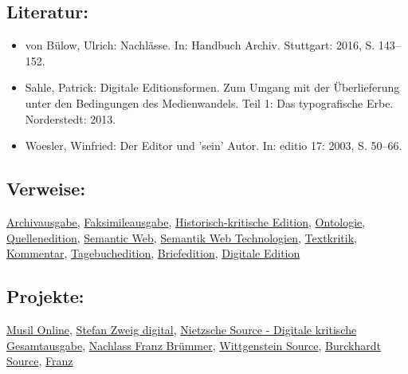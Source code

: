 \documentclass{article}
\begin{document}
        \subsection*{Literatur:}\begin{itemize}\item von Bülow, Ulrich: Nachlässe. In: Handbuch Archiv. Stuttgart: 2016, S. 143–152.\item Sahle, Patrick: Digitale Editionsformen. Zum Umgang mit der
                              Überlieferung unter den Bedingungen des Medienwandels. Teil 1: Das
                              typografische Erbe. Norderstedt: 2013.\item Woesler, Winfried: Der Editor und 'sein' Autor. In: editio 17: 2003, S. 50–66.\end{itemize}\subsection*{Verweise:}\href{https://gams.uni-graz.at/o:konde.33}{Archivausgabe}, \href{https://gams.uni-graz.at/o:konde.83}{Faksimileausgabe}, \href{https://gams.uni-graz.at/o:konde.93}{Historisch-kritische Edition}, \href{https://gams.uni-graz.at/o:konde.151}{Ontologie}, \href{https://gams.uni-graz.at/o:konde.160}{Quellenedition}, \href{https://gams.uni-graz.at/o:konde.167}{Semantic Web}, \href{https://gams.uni-graz.at/o:konde.168}{Semantik Web Technologien}, \href{https://gams.uni-graz.at/o:konde.192}{Textkritik}, \href{https://gams.uni-graz.at/o:konde.34}{Kommentar}, \href{https://gams.uni-graz.at/o:konde.175}{Tagebuchedition}, \href{https://gams.uni-graz.at/o:konde.39}{Briefedition}, \href{https://gams.uni-graz.at/o:konde.59}{Digitale Edition}\subsection*{Projekte:}\href{http://musilonline.at}{Musil Online}, \href{www.stefanzweig.digital}{Stefan Zweig
                           digital}, \href{http://www.nietzschesource.org/#eKGWB}{Nietzsche Source - Digitale kritische Gesamtausgabe}, \href{http://bruemmer.staatsbibliothek-berlin.de/nlbruemmer/}{Nachlass
                           Franz Brümmer}, \href{http://www.wittgensteinsource.org}{Wittgenstein
                           Source}, \href{http://burckhardtsource.org}{Burckhardt
                           Source}, \href{https://gams.uni-graz.at/context:bag}{Franz
}
\end{document}
